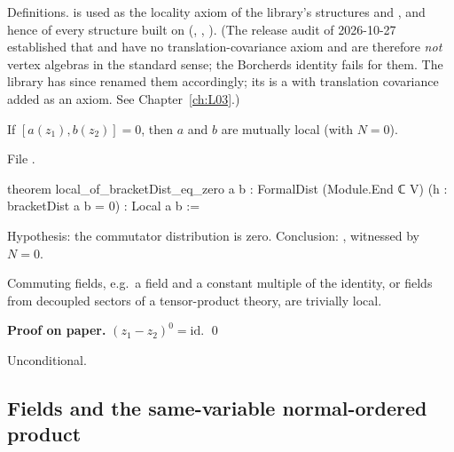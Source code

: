\begin{status}
Definitions.  is used as the locality axiom of the library's structures  and
, and hence of every structure built on  (,
, ). (The release audit of 2026-10-27 established that
 and  have no translation-covariance axiom and are therefore \emph{not} vertex algebras in
the standard sense; the Borcherds identity fails for them. The library has since renamed them accordingly; its
 is a  with translation covariance added as an axiom. See Chapter~\ref{ch:L03}.)
\end{status}

\begin{proposition}\label{l01:prop:localzero}
If $[a(z_1),b(z_2)] = 0$, then $a$ and $b$ are mutually local (with $N = 0$).
\end{proposition}

\noindent File .
\begin{leancode}
theorem local_of_bracketDist_eq_zero {a b : FormalDist (Module.End ℂ V)}
    (h : bracketDist a b = 0) : Local a b :=
\end{leancode}

\begin{dictionary}
Hypothesis: the commutator distribution is zero. Conclusion: , witnessed by $N = 0$.
\end{dictionary}

\begin{physics}
Commuting fields, e.g.\ a field and a constant multiple of the identity, or fields from decoupled sectors of
a tensor-product theory, are trivially local.
\end{physics}

\textbf{Proof on paper.} $(z_1-z_2)^0 = \mathrm{id}$. \qed

\begin{status}
Unconditional.
\end{status}

\subsection{Fields and the same-variable normal-ordered product}\label{l01:sec:field}

